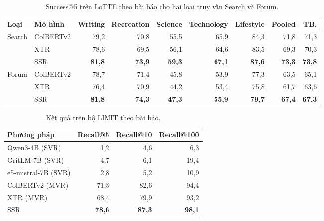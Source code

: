 \documentclass[a4paper,13pt]{extreport}
\theoremstyle{plain}
\newcommand{\ssr}{SSR}
\begin{document}
\begin{table}[htbp]
\centering
\caption{Success@5 trên LoTTE theo bài báo cho hai loại truy vấn Search và Forum.}
\label{tab:lotte}
\scriptsize
\begin{tabular}{llrrrrrrr}
\toprule
\textbf{Loại} & \textbf{Mô hình} & Writing & Recreation & Science & Technology & Lifestyle & Pooled & TB.\\
\midrule
\multirow{3}{*}{Search} & ColBERTv2 & 79,2 & 70,8 & 55,5 & 65,9 & 84,3 & 71,8 & 71,3\\
 & XTR & 78,6 & 69,5 & 56,1 & 64,6 & 83,5 & 69,3 & 70,3\\
 & \ssr & \textbf{81,8} & \textbf{73,9} & \textbf{59,3} & \textbf{67,1} & \textbf{87,6} & \textbf{73,3} & \textbf{73,8}\\
\midrule
\multirow{3}{*}{Forum} & ColBERTv2 & 78,7 & 71,4 & 45,8 & 53,9 & 77,3 & 63,5 & 65,1\\
 & XTR & 76,4 & 70,9 & 44,2 & 53,4 & 75,8 & 61,7 & 63,6\\
 & \ssr & \textbf{81,8} & \textbf{74,3} & \textbf{47,3} & \textbf{55,9} & \textbf{79,7} & \textbf{67,4} & \textbf{67,3}\\
\bottomrule
\end{tabular}
\end{table}

\begin{table}[htbp]
\centering
\caption{Kết quả trên bộ LIMIT theo bài báo.}
\label{tab:limit}
\small
\begin{tabular}{lrrr}
\toprule
\textbf{Phương pháp} & \textbf{Recall@5} & \textbf{Recall@10} & \textbf{Recall@100}\\
\midrule
Qwen3-4B (SVR) & 1,2 & 4,6 & 6,3\\
GritLM-7B (SVR) & 4,7 & 6,1 & 19,4\\
e5-mistral-7B (SVR) & 2,8 & 5,2 & 10,9\\
ColBERTv2 (MVR) & 71,8 & 82,6 & 94,4\\
XTR (MVR) & 68,4 & 79,9 & 93,2\\
\ssr & \textbf{78,6} & \textbf{87,3} & \textbf{98,1}\\
\bottomrule
\end{tabular}
\end{table}
\end{document}
